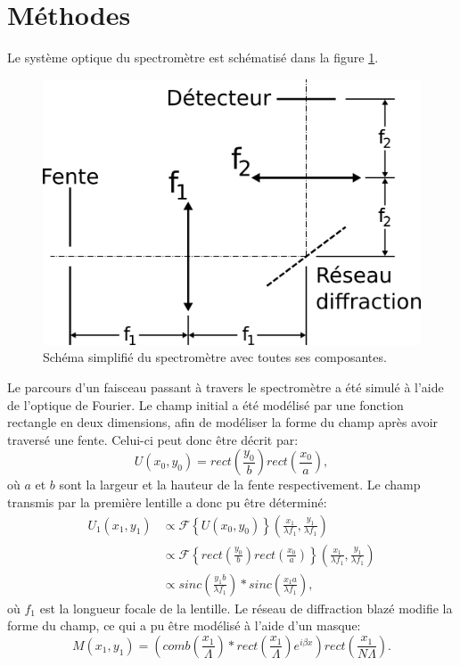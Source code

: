 \documentclass[conference]{IEEEtran}
\begin{document}
\section{Méthodes \label{methodes}}
Le système optique du spectromètre est schématisé dans la figure \ref{4f}.
\begin{figure}[H]
    \centering
    \includegraphics[scale=0.4]{4f.png}
    \caption{Schéma simplifié du spectromètre avec toutes ses composantes. \label{4f}}
\end{figure}
Le parcours d'un faisceau passant à travers le spectromètre a été simulé à l'aide 
de l'optique de Fourier. Le champ initial a été modélisé par une fonction rectangle en deux dimensions,
afin de modéliser la forme du champ après avoir traversé une fente. Celui-ci peut donc être décrit par:
\[U(x_0,y_0)=rect(\frac{y_0}{b})rect(\frac{x_0}{a}),\]
où $a$ et $b$ sont la largeur et la hauteur de la fente respectivement. Le champ transmis par 
la première lentille a donc pu être déterminé:
\begin{align*}
    U_1(x_1,y_1)&\propto\mathscr{F}\left\{U(x_0,y_0)\right\}(\frac{x_1}{\lambda f_1},\frac{y_1}{\lambda f_1})\\
    &\propto \mathscr{F}\left\{rect(\frac{y_0}{b})rect(\frac{x_0}{a})\right\}(\frac{x_1}{\lambda f_1},\frac{y_1}{\lambda f_1})\\
    &\propto sinc(\frac{y_1b}{\lambda f_1})\ast sinc(\frac{x_1a}{\lambda f_1}),
\end{align*}
où $f_1$ est la longueur focale de la lentille. Le réseau de diffraction blazé modifie la forme du champ, ce qui a pu être
modélisé à l'aide d'un masque:
\[M(x_1,y_1)=(comb(\frac{x_1}{\Lambda})\ast rect(\frac{x_1}{\Lambda})e^{i\beta x})rect(\frac{x_1}{N\Lambda}).\]
\end{document}
